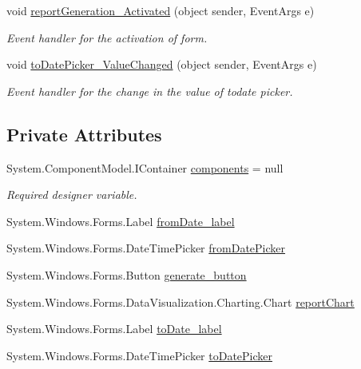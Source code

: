 \begin{DoxyCompactItemize}
void \hyperlink{classWildlifeTrackingApp_1_1Report_a2a3664c6456b8f19a68866509ec3d802}{report\+Generation\+\_\+\+Activated} (object sender, Event\+Args e)
\begin{DoxyCompactList}\small\item\em Event handler for the activation of form. \end{DoxyCompactList}\item 
void \hyperlink{classWildlifeTrackingApp_1_1Report_a3479aaacdf8b5caeede09ea6a098e25f}{to\+Date\+Picker\+\_\+\+Value\+Changed} (object sender, Event\+Args e)
\begin{DoxyCompactList}\small\item\em Event handler for the change in the value of todate picker. \end{DoxyCompactList}\end{DoxyCompactItemize}
\subsection*{Private Attributes}
\begin{DoxyCompactItemize}
\item 
System.\+Component\+Model.\+I\+Container \hyperlink{classWildlifeTrackingApp_1_1Report_a02595f1c09713bb71dcb2fbbfc7ffa4b}{components} = null
\begin{DoxyCompactList}\small\item\em Required designer variable. \end{DoxyCompactList}\item 
System.\+Windows.\+Forms.\+Label \hyperlink{classWildlifeTrackingApp_1_1Report_ae086ffc402f846f057da52c2e5f5e9b5}{from\+Date\+\_\+label}
\item 
System.\+Windows.\+Forms.\+Date\+Time\+Picker \hyperlink{classWildlifeTrackingApp_1_1Report_abff71dccee21e2fcd7b2e912b3b7c608}{from\+Date\+Picker}
\item 
System.\+Windows.\+Forms.\+Button \hyperlink{classWildlifeTrackingApp_1_1Report_a44b2ab91fc54d54d9ef460e816ae272e}{generate\+\_\+button}
\item 
System.\+Windows.\+Forms.\+Data\+Visualization.\+Charting.\+Chart \hyperlink{classWildlifeTrackingApp_1_1Report_a9ba237d7da8d44242a02064a69dc9bcd}{report\+Chart}
\item 
System.\+Windows.\+Forms.\+Label \hyperlink{classWildlifeTrackingApp_1_1Report_a1534049397f4b7ab97324f502b5f5335}{to\+Date\+\_\+label}
\item 
System.\+Windows.\+Forms.\+Date\+Time\+Picker \hyperlink{classWildlifeTrackingApp_1_1Report_afd2fec8eb0f1c33b3b723a6d349c20ed}{to\+Date\+Picker}
\end{DoxyCompactItemize}
